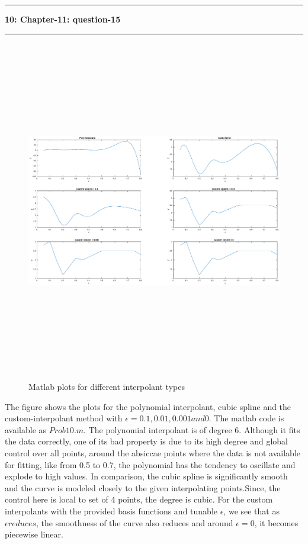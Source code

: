 \documentclass{article}
\newcommand\question[2]{\vspace{.25in}\hrule\textbf{#1: #2}\hrule\vspace{.10in}}
\begin{document}
\question{10}{Chapter-11: question-15}
  \begin{figure}[H]
   \centering
  \includegraphics[width=15cm, height=15cm]{fig10}
  \caption{Matlab plots for different interpolant types}
  \end{figure}

  The figure shows the plots for the polynomial interpolant, cubic spline and the custom-interpolant method with $\epsilon =0.1,0.01, 0.001 and 0$. The matlab code is available as $Prob10.m$. The polynomial interpolant is of degree 6. Although it fits the data correctly, one of its bad property is due to its high degree and global control over all points, around the absiccae points where the data is not available for fitting, like from 0.5 to 0.7, the polynomial has the tendency to oscillate and explode to high values. In comparison, the cubic spline is significantly smooth and the curve is modeled closely to the given interpolating points.Since, the control here is local to set of 4 points, the degree is cubic. For the custom interpolants with the provided basis functions and tunable $\epsilon$, we see that as $\epsilon reduces$, the smoothness of the curve also reduces and around $\epsilon=0$, it becomes piecewise linear. 
\end{document}
